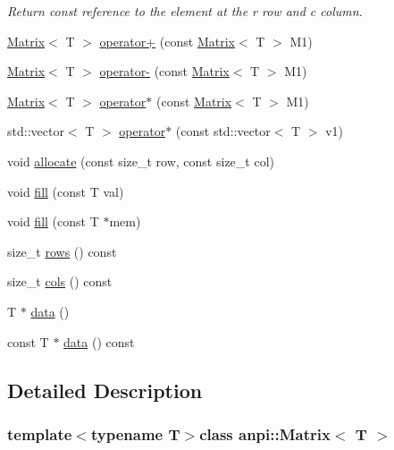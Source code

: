 \begin{DoxyCompactItemize}
\begin{DoxyCompactList}\small\item\em Return const reference to the element at the r row and c column. \end{DoxyCompactList}\item 
\hyperlink{classanpi_1_1_matrix}{Matrix}$<$ T $>$ \hyperlink{classanpi_1_1_matrix_add23688fba9abe5d636abccb6ac71718}{operator+} (const \hyperlink{classanpi_1_1_matrix}{Matrix}$<$ T $>$ M1)
\item 
\hyperlink{classanpi_1_1_matrix}{Matrix}$<$ T $>$ \hyperlink{classanpi_1_1_matrix_a74bfd6dc7f3b605da2a6ea60ec90c58e}{operator-\/} (const \hyperlink{classanpi_1_1_matrix}{Matrix}$<$ T $>$ M1)
\item 
\hyperlink{classanpi_1_1_matrix}{Matrix}$<$ T $>$ \hyperlink{classanpi_1_1_matrix_aa54f3a0026abb1a06a1e8067f0094f6b}{operator$\ast$} (const \hyperlink{classanpi_1_1_matrix}{Matrix}$<$ T $>$ M1)
\item 
std\+::vector$<$ T $>$ \hyperlink{classanpi_1_1_matrix_a55ca04bf6f7275a2892b256278e25bb7}{operator$\ast$} (const std\+::vector$<$ T $>$ v1)
\item 
void \hyperlink{classanpi_1_1_matrix_ac3ac962e6058ef48b58e654e4ea7ed65}{allocate} (const size\+\_\+t row, const size\+\_\+t col)
\item 
void \hyperlink{classanpi_1_1_matrix_ad7b7f6f61d23ae8ccd7e3a19e82a8c63}{fill} (const T val)
\item 
void \hyperlink{classanpi_1_1_matrix_a2df6d413691d4aa8d0e958eb74ee394b}{fill} (const T $\ast$mem)
\item 
size\+\_\+t \hyperlink{classanpi_1_1_matrix_a4b786272497d9f67f120a226c1bfcff4}{rows} () const 
\item 
size\+\_\+t \hyperlink{classanpi_1_1_matrix_a5bd9f2fe255fe0390bfe880877222b2a}{cols} () const 
\item 
T $\ast$ \hyperlink{classanpi_1_1_matrix_ad620d822fefc019cef07f4c1fb1c7052}{data} ()
\item 
const T $\ast$ \hyperlink{classanpi_1_1_matrix_a1f1196beed4607edc1509ede6ef26217}{data} () const 
\end{DoxyCompactItemize}


\subsection{Detailed Description}
\subsubsection*{template$<$typename T$>$class anpi\+::\+Matrix$<$ T $>$}

